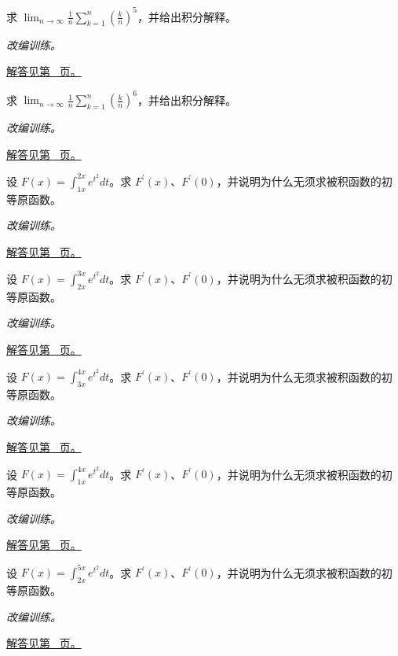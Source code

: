 \documentclass[UTF8,12pt,a4paper,fontset=fandol]{ctexart}
\begin{document}
\begin{example}[黎曼和的识别]\label{ex:c17q7}
求 $\displaystyle\lim_{n\to\infty}\frac1n\sum_{k=1}^n\left(\frac kn\right)^{5}$，并给出积分解释。
\par\textit{改编训练。}\par\hyperref[ans:c17q7]{解答见第~\pageref{ans:c17q7} 页。}
\end{example}
\begin{example}[黎曼和的识别]\label{ex:c17q8}
求 $\displaystyle\lim_{n\to\infty}\frac1n\sum_{k=1}^n\left(\frac kn\right)^{6}$，并给出积分解释。
\par\textit{改编训练。}\par\hyperref[ans:c17q8]{解答见第~\pageref{ans:c17q8} 页。}
\end{example}
\begin{example}[两个积分端点都在变化]\label{ex:c17q9}
设 $F(x)=\displaystyle\int_{1x}^{2x}e^{t^2}dt$。求 $F^{\prime}(x)$、$F^{\prime}(0)$，并说明为什么无须求被积函数的初等原函数。
\par\textit{改编训练。}\par\hyperref[ans:c17q9]{解答见第~\pageref{ans:c17q9} 页。}
\end{example}
\begin{example}[两个积分端点都在变化]\label{ex:c17q10}
设 $F(x)=\displaystyle\int_{2x}^{3x}e^{t^2}dt$。求 $F^{\prime}(x)$、$F^{\prime}(0)$，并说明为什么无须求被积函数的初等原函数。
\par\textit{改编训练。}\par\hyperref[ans:c17q10]{解答见第~\pageref{ans:c17q10} 页。}
\end{example}
\begin{example}[两个积分端点都在变化]\label{ex:c17q11}
设 $F(x)=\displaystyle\int_{3x}^{4x}e^{t^2}dt$。求 $F^{\prime}(x)$、$F^{\prime}(0)$，并说明为什么无须求被积函数的初等原函数。
\par\textit{改编训练。}\par\hyperref[ans:c17q11]{解答见第~\pageref{ans:c17q11} 页。}
\end{example}
\begin{example}[两个积分端点都在变化]\label{ex:c17q12}
设 $F(x)=\displaystyle\int_{1x}^{4x}e^{t^2}dt$。求 $F^{\prime}(x)$、$F^{\prime}(0)$，并说明为什么无须求被积函数的初等原函数。
\par\textit{改编训练。}\par\hyperref[ans:c17q12]{解答见第~\pageref{ans:c17q12} 页。}
\end{example}
\begin{example}[两个积分端点都在变化]\label{ex:c17q13}
设 $F(x)=\displaystyle\int_{2x}^{5x}e^{t^2}dt$。求 $F^{\prime}(x)$、$F^{\prime}(0)$，并说明为什么无须求被积函数的初等原函数。
\par\textit{改编训练。}\par\hyperref[ans:c17q13]{解答见第~\pageref{ans:c17q13} 页。}
\end{example}
\end{document}
